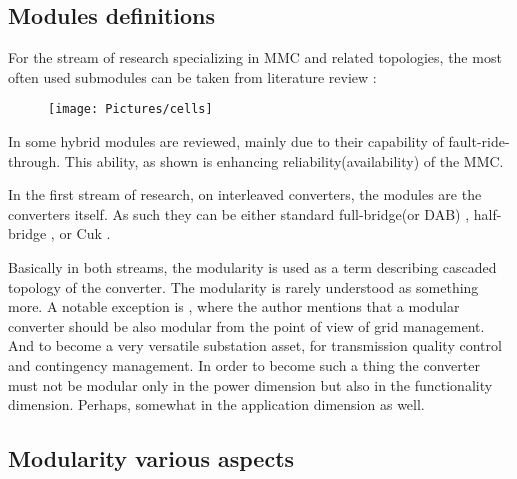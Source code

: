 \documentclass[]{scrartcl}
\begin{document}
\subsection{Modules definitions}
For the stream of research specializing in MMC and related topologies, the most often used submodules can be taken from literature review \cite{Perez2014}:

\begin{figure}[h!]
	\centering
	\texttt{[image: Pictures/cells]}
	\caption{}
	\label{fig:cells}
\end{figure}




In \cite{Xu2016b} some hybrid modules are reviewed, mainly due to their capability of fault-ride-through. This ability, as shown is enhancing reliability(availability) of the MMC. 


In the first stream of research, on interleaved converters, the modules are the converters itself. As such they can be either standard full-bridge(or DAB) \cite{Bottion2015}, half-bridge \cite{Yao2012}, or Cuk \cite{Kamnarn2009}. 

Basically in both streams, the modularity is used as a term describing cascaded topology of the converter. The modularity is rarely understood as something more. A notable exception is \cite{Yousefpoor2014}, where the author mentions that a modular converter should be also modular from the point of view of grid management. And to become a very versatile  substation asset, for transmission quality control and contingency management. In order to become such a thing the converter must not be modular only in the power dimension but also in the functionality dimension. Perhaps, somewhat in the application dimension as well. 


\subsection{Modularity various aspects}
%
\end{document}
